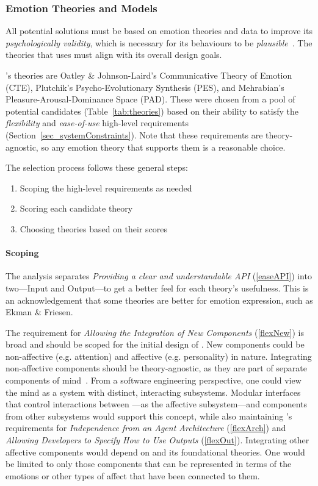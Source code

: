 \subsubsection{Emotion Theories and Models}\label{sec_theories}
All potential \progname{} solutions must be based on emotion theories and data
to improve its \textit{psychologically validity}, which is necessary for its
behaviours to be \textit{plausible}~\citep[p.~216--217]{broekens2016emotional}.
The theories that \progname{} uses must align with its overall design goals.

\progname{}'s theories are Oatley \& Johnson-Laird's Communicative Theory of
Emotion (CTE), Plutchik's Psycho-Evolutionary Synthesis (PES), and Mehrabian's
Pleasure-Arousal-Dominance Space (PAD). These were chosen from a pool of
potential candidates (Table~\ref{tab:theories}) based on their ability to
satisfy the \textit{flexibility} and \textit{ease-of-use} high-level
requirements (Section~\ref{sec_systemConstraints}). Note that these
requirements are theory-agnostic, so any emotion theory that supports them is a
reasonable choice.

The selection process follows these general steps:
\begin{enumerate}
    \item Scoping the high-level requirements as needed
    \item Scoring each candidate theory
    \item Choosing theories based on their scores
\end{enumerate}

\paragraph{Scoping}
The analysis separates \textit{Providing a clear and understandable API}
(\ref{easeAPI}) into two---Input and Output---to get a better feel for each
theory's usefulness. This is an acknowledgement that some theories are better
for emotion expression, such as Ekman \& Friesen.

The requirement for \textit{Allowing the Integration of New Components}
(\ref{flexNew}) is broad and should be scoped for the initial design of
\progname{}. New \progname{} components could be non-affective (e.g. attention)
and affective (e.g. personality) in nature. Integrating non-affective
components should be theory-agnostic, as they are part of separate components
of mind~\citep{cognitiondef}. From a software engineering perspective, one
could view the mind as a system with distinct, interacting subsystems. Modular
interfaces that control interactions between \progname{}---as the affective
subsystem---and components from other subsystems would support this concept,
while also maintaining \progname{}'s requirements for \textit{Independence from
an Agent Architecture} (\ref{flexArch}) and \textit{Allowing Developers to
Specify How to Use Outputs} (\ref{flexOut}). Integrating other affective
components would depend on \progname{} and its foundational theories. One would
be limited to only those components that can be represented in terms of the
emotions or other types of affect that have been connected to them.

